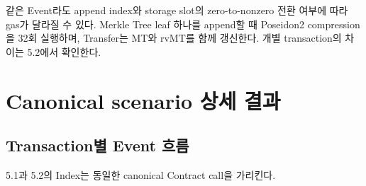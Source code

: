 \documentclass[11pt,a4paper]{extarticle}
\newcommand{\MT}{\mathrm{MT}}
\newcommand{\rvMT}{\mathrm{rvMT}}
\begin{document}
같은 Event라도 append index와 storage slot의 zero-to-nonzero 전환 여부에 따라 gas가 달라질
수 있다. Merkle Tree leaf 하나를 append할 때 Poseidon2 compression을 32회 실행하며,
Transfer는 $\MT$와 $\rvMT$를 함께 갱신한다. 개별 transaction의 차이는 5.2에서 확인한다.

\clearpage
\section{Canonical scenario 상세 결과}

\subsection{Transaction별 Event 흐름}

5.1과 5.2의 Index는 동일한 canonical Contract call을 가리킨다.
\end{document}
